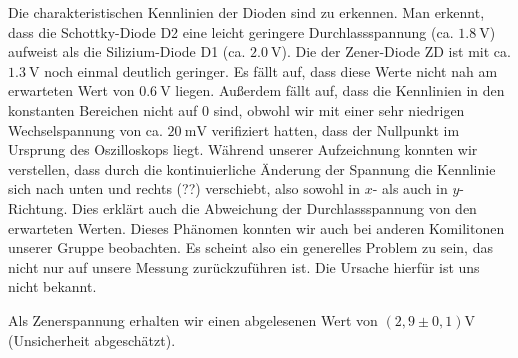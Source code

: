 Die charakteristischen Kennlinien der Dioden sind zu erkennen. 
Man erkennt, dass die Schottky-Diode D2 eine leicht geringere Durchlassspannung (ca. $\SI{1,8}{\volt}$) aufweist als die Silizium-Diode D1 (ca. $\SI{2,0}{\volt}$).
Die der Zener-Diode ZD ist mit ca. $\SI{1,3}{\volt}$ noch einmal deutlich geringer.
Es fällt auf, dass diese Werte nicht nah am erwarteten Wert von $\SI{0,6}{\volt}$ liegen.
Außerdem fällt auf, dass die Kennlinien in den konstanten Bereichen nicht auf 0 sind, 
obwohl wir mit einer sehr niedrigen Wechselspannung von ca. $\SI{20}{\milli\volt}$ verifiziert hatten, dass der Nullpunkt im Ursprung des Oszilloskops liegt.
Während unserer Aufzeichnung konnten wir verstellen, dass durch die kontinuierliche Änderung der Spannung die Kennlinie sich nach unten und rechts (??) verschiebt,
also sowohl in $x$- als auch in $y$-Richtung.
Dies erklärt auch die Abweichung der Durchlassspannung von den erwarteten Werten.
Dieses Phänomen konnten wir auch bei anderen Komilitonen unserer Gruppe beobachten. 
Es scheint also ein generelles Problem zu sein, das nicht nur auf unsere Messung zurückzuführen ist.
Die Ursache hierfür ist uns nicht bekannt.

Als Zenerspannung erhalten wir einen abgelesenen Wert von $(2,9 \pm 0,1)\si{\volt}$ (Unsicherheit abgeschätzt).